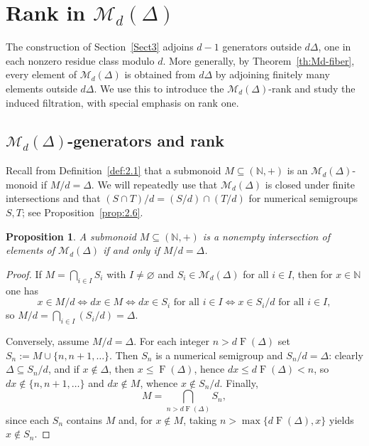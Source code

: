 \documentclass[12pt,a4paper]{amsart}
\newtheorem{proposition}[theorem]{Proposition}
\theoremstyle{definition}
\theoremstyle{remark}
\begin{document}
\section{\texorpdfstring{Rank in $\mathcal{M}_d(\Delta)$}{Rank in Md(Delta)}}\label{Sect4}

The construction of Section~\ref{Sect3} adjoins $d-1$ generators outside $d\Delta$, one in each nonzero residue class modulo $d$. More generally, by Theorem~\ref{th:Md-fiber}, every element of $\mathcal{M}_d(\Delta)$ is obtained from $d\Delta$ by adjoining finitely many elements outside $d\Delta$.  We use this to introduce the $\mathcal{M}_d(\Delta)$-rank and study the induced filtration, with special emphasis on rank one.

\subsection{\texorpdfstring{$\mathcal{M}_d(\Delta)$-generators and rank}{Md(Delta)-generators and rank}}

Recall from Definition~\ref{def:2.1} that a submonoid $M\subseteq(\mathbb{N},+)$ is an $\mathcal{M}_d(\Delta)$-monoid if $M/d=\Delta$. We will repeatedly use that $\mathcal{M}_d(\Delta)$ is closed under finite intersections and that $(S\cap T)/d=(S/d)\cap(T/d)$ for numerical semigroups $S,T$; see Proposition~\ref{prop:2.6}.

\begin{proposition}\label{prop:arb-inter}
A submonoid $M\subseteq(\mathbb{N},+)$ is a nonempty intersection of elements of $\mathcal{M}_d(\Delta)$ if and only if $M/d=\Delta$.
\end{proposition}

\begin{proof}
If $M=\bigcap_{i\in I}S_i$ with $I\neq\varnothing$ and
$S_i\in\mathcal{M}_d(\Delta)$ for all $i\in I$, then for $x\in\mathbb{N}$ one has
\[
x\in M/d \iff dx\in M \iff dx\in S_i \text{ for all } i\in I
\iff x\in S_i/d \text{ for all } i\in I,
\]
so $M/d=\bigcap_{i\in I}(S_i/d)=\Delta$.

Conversely, assume $M/d=\Delta$. For each integer $n>d\operatorname{F}(\Delta)$ set
$S_n:=M\cup\{n,n+1,\dots\}$.
Then $S_n$ is a numerical semigroup and $S_n/d=\Delta$: clearly
$\Delta\subseteq S_n/d$, and if $x\notin\Delta$, then $x\le \operatorname{F}(\Delta)$, hence
$dx\le d\operatorname{F}(\Delta)<n$, so $dx\notin\{n,n+1,\dots\}$ and $dx\notin M$, whence
$x\notin S_n/d$.
Finally,
\[
M=\bigcap_{n>d\operatorname{F}(\Delta)}S_n,
\]
since each $S_n$ contains $M$ and, for $x\notin M$, taking
$n>\max\{d\operatorname{F}(\Delta),x\}$ yields $x\notin S_n$.
\end{proof}
\end{document}
